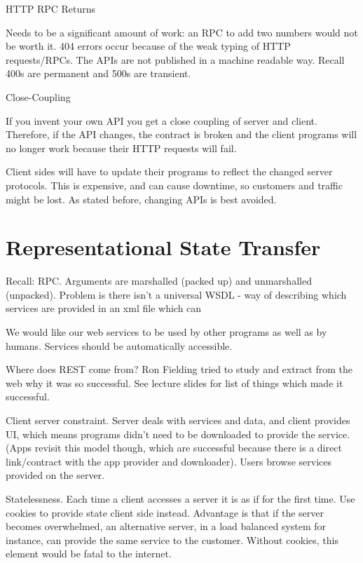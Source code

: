\documentclass[11pt]{article}
\begin{document}
HTTP RPC Returns

Needs to be a significant amount of work: an RPC to add two numbers would not be worth it.
404 errors occur because of the weak typing of HTTP requests/RPCs. The APIs are not published in a machine readable way. Recall 400s are permanent and 500s are transient.

Close-Coupling

If you invent your own API you get a close coupling of server and client. Therefore, if the API changes, the contract is broken and the client programs will no longer work because their HTTP requests will fail.

Client sides will have to update their programs to reflect the changed server protocols. This is expensive, and can cause downtime, so customers and traffic might be lost. As stated before, changing APIs is best avoided.



\section{Representational State Transfer}
\label{sec:ReST}

Recall: RPC. Arguments are marshalled (packed up) and unmarshalled (unpacked). Problem is there isn’t a universal WSDL - way of describing which services are provided in an xml file which can 

We would like our web services to be used by other programs as well as by humans. Services should be automatically accessible.

Where does REST come from? Ron Fielding tried to study and extract from the web why it was so successful. See lecture slides for list of things which made it successful.

Client server constraint. Server deals with services and data, and client provides UI, which means programs didn't need to be downloaded to provide the service. (Apps revisit this model though, which are successful because there is a direct link/contract with the app provider and downloader). Users browse services provided on the server.

Statelessness. Each time a client accesses a server it is as if for the first time. Use cookies to provide state client side instead. Advantage is that if the server becomes overwhelmed, an alternative server, in a load balanced system for instance, can provide the same service to the customer. Without cookies, this element would be fatal to the internet.
\end{document}
